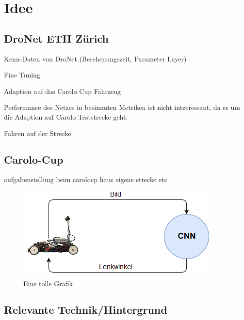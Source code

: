 %
\chapter{Idee}

\section{DroNet ETH Zürich}

Kenn-Daten von DroNet (Berehcnungszeit, Parameter Layer)

Fine Tuning 

Adaption auf das Carolo Cup Fahrzeug

Performance des Netzes in besimmten Metriken ist nicht intzeressant, da es um die Adaption auf Carolo Teststrecke geht.

Fahren auf der Strecke 


\section{Carolo-Cup}

aufgabenstellung beim carolocp
haus eigene strecke etc

\begin{figure}
	\centering
	\includegraphics[scale=0.7]{figures/Aufbau.png}
	\caption{Eine tolle Grafik}
	\label{img:toll ist das}
\end{figure}


\section{Relevante Technik/Hintergrund}

